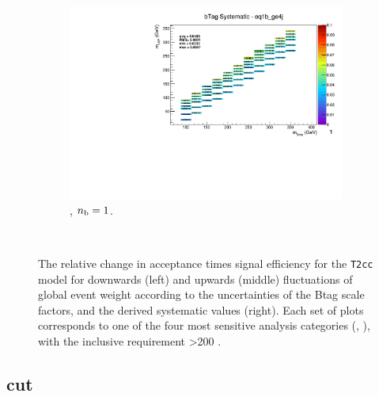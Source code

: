 \begin{figure}[ht!]
\begin{subfigure}[b]{0.32\textwidth}
    \includegraphics[width=\textwidth, page=1]{Figs/sms/t2cc/v37_2/systs/T2cc_bTag_eq1b_ge4j.pdf}
    \caption{\njhigh, $n_{\text{b}} = 1$.}
  \end{subfigure}\\
  \caption{The relative change in acceptance times signal efficiency for the
  \texttt{T2cc} model for downwards (left) and upwards (middle) fluctuations
  of global event weight according to the uncertainties of the Btag scale 
  factors,
  and the derived systematic values (right). Each set of plots corresponds
  to one of the four most sensitive analysis categories (\nb, \nj), with the
  inclusive requirement \HT>200 \gev.}
  \label{fig:sms-btag-t2cc}
\end{figure}


\newpage
\subsection*{\mhtmet cut}
\label{sec:t2cc_mhtmet_plots}

